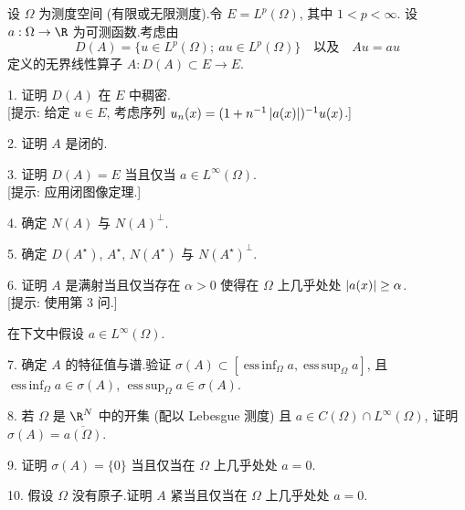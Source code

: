 \begin{problem}[第 4, 6 章]
\label{prob:33}
设 $\Omega$ 为测度空间 (有限或无限测度).令 $E=L^p(\Omega)$, 其中 $1<p<\infty$.
设 $a:\Omega\to\R$ 为可测函数.考虑由
\begin{equation*}
D(A)=\{u\in L^p(\Omega);\ au\in L^p(\Omega)\}\quad\text{以及}\quad Au=au
\end{equation*}
定义的无界线性算子 $A:D(A)\subset E\to E$.

1. 证明 $D(A)$ 在 $E$ 中稠密.\\
{[提示: 给定 $u\in E$, 考虑序列 $u_n(x)=(1+n^{-1}\left|a(x)\right|)^{-1}u(x)$.]}

2. 证明 $A$ 是闭的.

3. 证明 $D(A)=E$ 当且仅当 $a\in L^\infty(\Omega)$.\\
{[提示: 应用闭图像定理.]}

4. 确定 $N(A)$ 与 $N(A)^\perp$.

5. 确定 $D(A^\star)$, $A^\star$, $N(A^\star)$ 与 $N(A^\star)^\perp$.

6. 证明 $A$ 是满射当且仅当存在 $\alpha>0$ 使得在 $\Omega$ 上几乎处处 $\left|a(x)\right|\ge\alpha$.\\
{[提示: 使用第 3 问.]}

在下文中假设 $a\in L^\infty(\Omega)$.

7. 确定 $A$ 的特征值与谱.验证 $\sigma(A)\subset[\operatorname{ess\,inf}_\Omega a,\operatorname{ess\,sup}_\Omega a]$,
且 $\operatorname{ess\,inf}_\Omega a\in\sigma(A)$, $\operatorname{ess\,sup}_\Omega a\in\sigma(A)$.

8. 若 $\Omega$ 是 $\R^N$ 中的开集 (配以 Lebesgue 测度) 且 $a\in C(\Omega)\cap L^\infty(\Omega)$,
证明 $\sigma(A)=\overline{a(\Omega)}$.

9. 证明 $\sigma(A)=\{0\}$ 当且仅当在 $\Omega$ 上几乎处处 $a=0$.

10. 假设 $\Omega$ 没有原子.证明 $A$ 紧当且仅当在 $\Omega$ 上几乎处处 $a=0$.
\end{problem}

